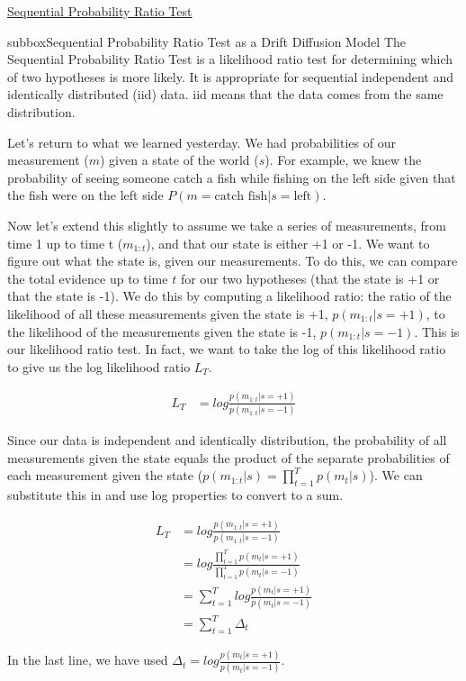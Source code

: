 \begin{textbox}{\href{https://compneuro.neuromatch.io/tutorials/W3D2_HiddenDynamics/student/W3D2_Tutorial1.html}{Sequential Probability Ratio Test }   }


\begin{subbox}{subbox}{Sequential Probability Ratio Test as a Drift Diffusion Model}
\scriptsize
The Sequential Probability Ratio Test is a likelihood ratio test for determining which of two hypotheses is more likely. It is appropriate for sequential independent and identically distributed (iid) data. iid means that the data comes from the same distribution.

Let's return to what we learned yesterday. We had probabilities of our measurement ($m$) given a state of the world ($s$). For example, we knew the probability of seeing someone catch a fish while fishing on the left side given that the fish were on the left side $P(m = \textrm{catch fish} | s = \textrm{left})$.

Now let's extend this slightly to assume we take a series of measurements, from time 1 up to time t ($m_{1:t}$), and that our state is either +1 or -1. We want to figure out what the state is, given our measurements. To do this, we can compare the total evidence up to time $t$ for our two hypotheses (that the state is +1 or that the state is -1). We do this by computing a likelihood ratio: the ratio of the likelihood of all these measurements given the state is +1, $p(m_{1:t}|s=+1)$, to the likelihood of the measurements given the state is -1, $p(m_{1:t}|s=-1)$. This is our likelihood ratio test. In fact, we want to take the log of this likelihood ratio to give us the log likelihood ratio $L_T$.

\begin{align*}
L_T &= log\frac{p(m_{1:t}|s=+1)}{p(m_{1:t}|s=-1)}
\end{align*}

Since our data is independent and identically distribution, the probability of all measurements given the state equals the product of the separate probabilities of each measurement given the state ($p(m_{1:t}|s) = \prod_{t=1}^T p(m_t | s) $). We can substitute this in and use log properties to convert to a sum.

\begin{align*}
L_T &= log\frac{p(m_{1:t}|s=+1)}{p(m_{1:t}|s=-1)}\\
&= log\frac{\prod_{t=1}^Tp(m_{t}|s=+1)}{\prod_{t=1}^Tp(m_{t}|s=-1)}\\
&= \sum_{t=1}^T log\frac{p(m_{t}|s=+1)}{p(m_{t}|s=-1)}\\
&= \sum_{t=1}^T \Delta_t
\end{align*}

In the last line, we have used $\Delta_t = log\frac{p(m_{t}|s=+1)}{p(m_{t}|s=-1)}$. 
\end{subbox}



\end{textbox}
